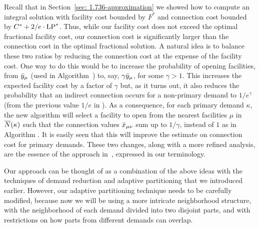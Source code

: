 \documentclass[oneside,final]{ucr}
\begin{document}
Recall that in Section~\ref{sec: 1.736-approximation} we showed how to
compute an integral solution with facility cost bounded by $F^\ast$
and connection cost bounded by $C^\ast + 2/e\cdot\mbox{\rm LP}^\ast$. Thus,
while our facility cost does not exceed the optimal fractional
facility cost, our connection cost is significantly larger than the
connection cost in the optimal fractional solution.  A natural idea is
to balance these two ratios by reducing the connection cost at the
expense of the facility cost. One way to do this would be to increase
the probability of opening facilities, from ${\bar y}_{\mu}$ (used in
Algorithm~{\ECHS}) to, say, $\gamma{\bar y}_{\mu}$, for some $\gamma >
1$. This increases the expected facility cost by a factor of $\gamma$
but, as it turns out, it also reduces the probability that an indirect
connection occurs for a non-primary demand to $1/e^\gamma$ (from the
previous value $1/e$ in {\ECHS}). As a consequence, for each primary
demand $\kappa$, the new algorithm will select a facility to open from
the nearest facilities $\mu$ in ${\overline{N}}(\kappa)$ such that the
connection values ${\bar x}_{\mu\nu}$ sum up to $1/\gamma$, instead of
$1$ as in Algorithm {\ECHS}. It is easily seen that this will improve
the estimate on connection cost for primary demands.  These two
changes, along with a more refined analysis, are the essence of the
approach in~\cite{ByrkaGS10}, expressed in our terminology.

Our approach can be thought of as a combination of the above ideas
with the techniques of demand reduction and
adaptive partitioning that we introduced earlier. However, our
adaptive partitioning technique needs to be carefully modified,
because now we will be using a more intricate neighborhood structure,
with the neighborhood of each demand divided into two disjoint parts,
and with restrictions on how parts from different demands can overlap.
\end{document}
